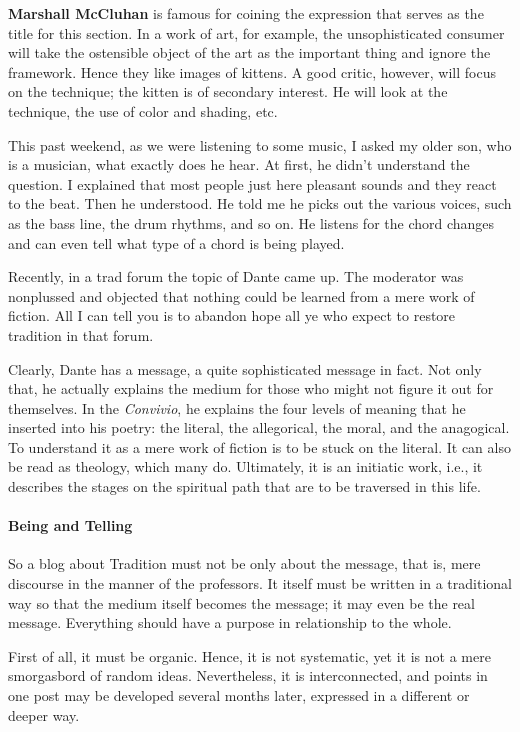 \textbf{Marshall McCluhan} is famous for coining the expression that serves as the title for this section. In a work of art, for example, the unsophisticated consumer will take the ostensible object of the art as the important thing and ignore the framework. Hence they like images of kittens. A good critic, however, will focus on the technique; the kitten is of secondary interest. He will look at the technique, the use of color and shading, etc.

This past weekend, as we were listening to some music, I asked my older son, who is a musician, what exactly does he hear. At first, he didn't understand the question. I explained that most people just here pleasant sounds and they react to the beat. Then he understood. He told me he picks out the various voices, such as the bass line, the drum rhythms, and so on. He listens for the chord changes and can even tell what type of a chord is being played.

Recently, in a trad forum the topic of Dante came up. The moderator was nonplussed and objected that nothing could be learned from a mere work of fiction. All I can tell you is to abandon hope all ye who expect to restore tradition in that forum.

Clearly, Dante has a message, a quite sophisticated message in fact. Not only that, he actually explains the medium for those who might not figure it out for themselves. In the \emph{Convivio}, he explains the four levels of meaning that he inserted into his poetry: the literal, the allegorical, the moral, and the anagogical. To understand it as a mere work of fiction is to be stuck on the literal. It can also be read as theology, which many do. Ultimately, it is an initiatic work, i.e., it describes the stages on the spiritual path that are to be traversed in this life.

\paragraph{Being and Telling}


So a blog about Tradition must not be only about the message, that is, mere discourse in the manner of the professors. It itself must be written in a traditional way so that the medium itself becomes the message; it may even be the real message. Everything should have a purpose in relationship to the whole.

First of all, it must be organic. Hence, it is not systematic, yet it is not a mere smorgasbord of random ideas. Nevertheless, it is interconnected, and points in one post may be developed several months later, expressed in a different or deeper way.

